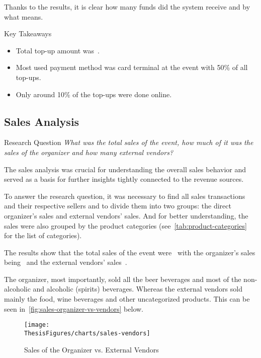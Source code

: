 Thanks to the results, it is clear how many funds did the system receive and by what means.

\begin{blue-box}{Key Takeaways}
	\begin{itemize}
		\item Total top-up amount was~.
		\item Most used payment method was card terminal at the event with 50\% of all top-ups.
		\item Only around 10\% of the top-ups were done online.
	\end{itemize}
\end{blue-box}

\subsection{Sales Analysis}
\label{subsec:analysis-sales}
\begin{gray-box}{Research Question}
	\textit{What was the total sales of the event, how much of it was the sales of the organizer and how many external vendors?}
\end{gray-box}

The sales analysis was crucial for understanding the overall sales behavior and served as a basis for further insights tightly connected to the revenue sources.

To answer the research question, it was necessary to find all sales transactions and their respective sellers and to divide them into two groups: the direct organizer's sales and external vendors' sales.
And for better understanding, the sales were also grouped by the product categories (see~\autoref{tab:product-categories} for the list of categories).

The results show that the total sales of the event were~ with the organizer's sales being~ and the external vendors' sales~.

The organizer, most importantly, sold all the beer beverages and most of the non-alcoholic and alcoholic (spirits) beverages.
Whereas the external vendors sold mainly the food, wine beverages and other uncategorized products.
This can be seen in~\autoref{fig:sales-organizer-vs-vendors} below.

\begin{figure}[H]
	\centering
	\texttt{[image: \\ThesisFigures/charts/sales-vendors]}
	\caption{Sales of the Organizer vs. External Vendors}
	\label{fig:sales-organizer-vs-vendors}
\end{figure}

